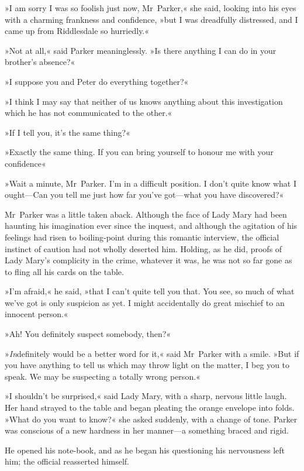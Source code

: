 »I am sorry I was so foolish just now, Mr~Parker,« she said, looking into his eyes with a charming frankness and confidence, »but I was dreadfully distressed, and I came up from Riddlesdale so hurriedly.«

»Not at all,« said Parker meaninglessly. »Is there anything I can do in your brother's absence?«

»I suppose you and Peter do everything together?«

»I think I may say that neither of us knows anything about this investigation which he has not communicated to the other.«

»If I tell you, it's the same thing?«

»Exactly the same thing. If you can bring yourself to honour me with your confidence\longdash«

»Wait a minute, Mr~Parker. I'm in a difficult position. I don't quite know what I ought—Can you tell me just how far you've got—what you have discovered?«

Mr~Parker was a little taken aback. Although the face of Lady Mary had been haunting his imagination ever since the inquest, and although the agitation of his feelings had risen to boiling-point during this romantic interview, the official instinct of caution had not wholly deserted him. Holding, as he did, proofs of Lady Mary's complicity in the crime, whatever it was, he was not so far gone as to fling all his cards on the table.

»I'm afraid,« he said, »that I can't quite tell you that. You see, so much of what we've got is only suspicion as yet. I might accidentally do great mischief to an innocent person.«

»Ah! You definitely suspect somebody, then?«

»\textit{In}definitely would be a better word for it,« said Mr~Parker with a smile. »But if you have anything to tell us which may throw light on the matter, I beg you to speak. We may be suspecting a totally wrong person.«

»I shouldn't be surprised,« said Lady Mary, with a sharp, nervous little laugh. Her hand strayed to the table and began pleating the orange envelope into folds. »What do you want to know?« she asked suddenly, with a change of tone. Parker was conscious of a new hardness in her manner—a something braced and rigid.

He opened his note-book, and as he began his questioning his nervousness left him; the official reasserted himself.

